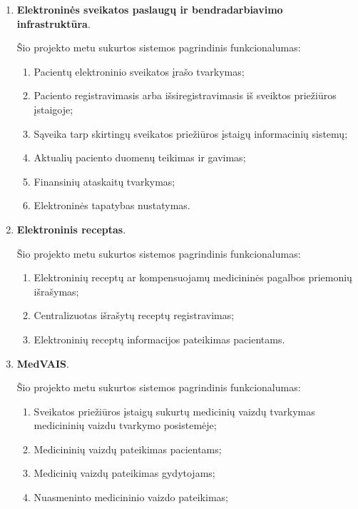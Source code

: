 \begin{enumerate}
    \item \textbf{Elektroninės sveikatos paslaugų ir bendradarbiavimo infrastruktūra}.
    
    Šio projekto metu sukurtos sistemos pagrindinis funkcionalumas:
    \begin{enumerate}
        \item Pacientų elektroninio sveikatos įrašo tvarkymas;
        \item Paciento registravimasis arba išsiregistravimasis iš sveiktos priežiūros įstaigoje;
        \item Sąveika tarp skirtingų sveikatos priežiūros įstaigų informacinių sistemų;
        \item Aktualių paciento duomenų teikimas ir gavimas;
        \item Finansinių ataskaitų tvarkymas;
        \item Elektroninės tapatybas nustatymas.
    \end{enumerate}
    \item \textbf{Elektroninis receptas}. 
    
    Šio projekto metu sukurtos sistemos pagrindinis funkcionalumas:
    \begin{enumerate}
        \item Elektroninių receptų ar kompensuojamų medicininės pagalbos priemonių išrašymas;
        \item Centralizuotas išrašytų receptų registravimas;
        \item Elektroninių receptų informacijos pateikimas pacientams.
    \end{enumerate}

    \item \textbf{MedVAIS}.
    
    Šio projekto metu sukurtos sistemos pagrindinis funkcionalumas:
    \begin{enumerate}
        \item Sveikatos priežiūros įstaigų sukurtų medicinių vaizdų tvarkymas medicininių vaizdu tvarkymo posistemėje;
        \item Medicininių vaizdų pateikimas pacientams;
        \item Medicinių vaizdų pateikimas gydytojams;
        \item Nuasmeninto medicininio vaizdo pateikimas;
    \end{enumerate}
\end{enumerate}

